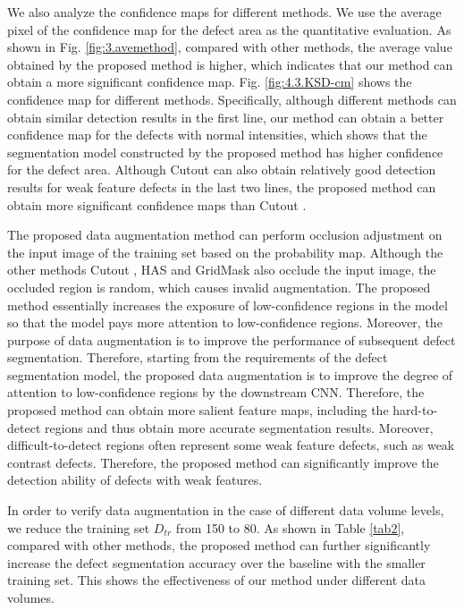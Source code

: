 \documentclass[sn-mathphys]{sn-jnl}%
\theoremstyle{thmstyleone}%
\theoremstyle{thmstyletwo}%
\theoremstyle{thmstylethree}%
\begin{document}
We also analyze the confidence maps for different methods. We use the average pixel of the confidence map for the defect area as the quantitative evaluation. As shown in Fig. \ref{fig:3.avemethod}, compared with other methods, the average value obtained by the proposed method is higher, which indicates that our method can obtain a more significant confidence map. Fig. \ref{fig:4.3.KSD-cm} shows the confidence map for different methods. Specifically,  although different methods can obtain similar detection results in the first line, our method can obtain a better confidence map for the defects with normal intensities, which shows that the segmentation model constructed by the proposed method has higher confidence for the defect area.  Although Cutout \cite{devries2017improved} can also obtain relatively good detection results for weak feature defects in the last two lines, the proposed method can obtain more significant confidence maps than Cutout \cite{devries2017improved}.

The proposed data augmentation method can perform occlusion adjustment on the input image of the training set based on the probability map. Although the other methods Cutout \cite{devries2017improved}, HAS\cite{singh2017hide} and GridMask \cite{chen2020gridmask} also occlude the input image, the occluded region is random, which causes invalid augmentation. The proposed method essentially increases the exposure of low-confidence regions in the model so that the model pays more attention to low-confidence regions. Moreover, the purpose of data augmentation is to improve the performance of subsequent defect segmentation. Therefore, starting from the requirements of the defect segmentation model, the proposed data augmentation is to improve the degree of attention to low-confidence regions by the downstream CNN. Therefore, the proposed method can obtain more salient feature maps, including the hard-to-detect regions and thus obtain more accurate segmentation results. Moreover, difficult-to-detect regions often represent some weak feature defects, such as weak contrast defects. Therefore, the proposed method can significantly improve the detection ability of defects with weak features.


In order to verify data augmentation in the case of different data volume levels, we reduce the training set $D_{tr}$ from 150 to 80. As shown in Table \ref{tab2}, compared with other methods, the proposed method can further significantly increase the defect segmentation accuracy over the baseline with the smaller training set. This shows the effectiveness of our method under different data volumes.
\end{document}
